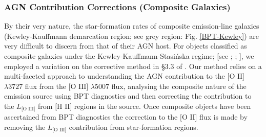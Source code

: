 \subsubsection{AGN Contribution Corrections (Composite Galaxies)}

By their very nature, the star-formation rates of composite emission-line galaxies (Kewley-Kauffmann demarcation region; see grey region: Fig. \ref{BPT-Kewley}) are very difficult to discern from that of their AGN host. For objects classified as composite galaxies under the Kewley-Kauffmann-Stasi{\'n}ska regime; [see \cite{Kewley_Dopita_Sutherland_Heisler_Trevena_2001}; \cite{Kauffmann_2003}; \cite{Stasinska_2006}], we employed a variation on the corrective method in §3.3 of \cite{Wild_2010}. Our method relies on a multi-faceted approach to understanding the AGN contribution to the $\text{[O II]}$ $\lambda3727$ flux from the $\text{[O III]}$ $\lambda5007$ flux, analysing the composite nature of the emission source using BPT diagnostics and then correcting the contribution to the $L_{\text{[O III]}}$ from $\text{[H II]}$ regions in the source. Once composite objects have been ascertained from BPT diagnostics the correction to the $\text{[O II]}$ flux is made by removing the $L_{\text{[O III]}}$ contribution from star-formation regions.   
  
  
  
  
  
  
  
  
  
  